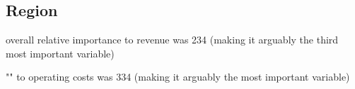 \documentclass[review,12pt,authoryear]{elsarticle}
\begin{document}
\begin{linenumbers}

% 

\subsection{Region}

overall relative importance to revenue was 234 (making it arguably the third most important variable)

"" to operating costs was 334 (making it arguably the most important variable)



\end{linenumbers}
\end{document}
